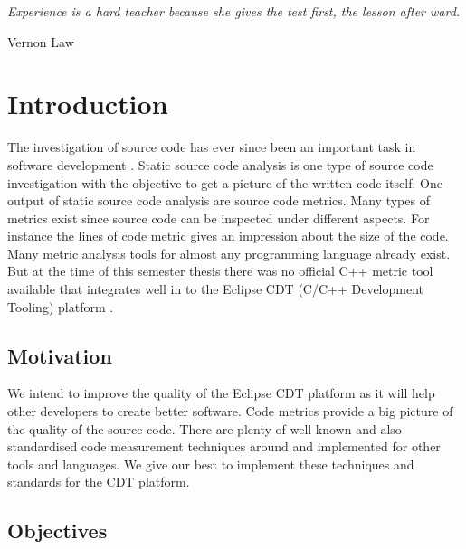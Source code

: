 \documentclass[11pt,a4paper,oneside]{scrreprt}
\begin{document}
\cleardoublepage
\newpage
\thispagestyle{empty}
\mbox{}
\newpage

\setcounter{tocdepth}{2}
\tableofcontents

\vspace{3cm}

\begin{center}
\textit{Experience is a hard teacher because she gives the test first, the lesson after ward.}
\\
\begin{flushright}
Vernon Law
\end{flushright}
\end{center}

\pagebreak
\clearpage{}
\chapter{Introduction}\label{Introduction}
The investigation of source code has ever since been an important task in software development \cite{historystaticanalysis}. Static source code analysis is one type of source code investigation with the objective to get a picture of the written code itself. One output of static source code analysis are source code metrics. Many types of metrics exist since source code can be inspected under different aspects. For instance the lines of code metric gives an impression about the size of the code.\\
Many metric analysis tools for almost any programming language already exist. But at the time of this semester thesis there was no official C++ metric tool available that integrates well in to the Eclipse CDT (C/C++ Development Tooling) platform \cite{CDT}.

\section{Motivation}
We intend to improve the quality of the Eclipse CDT platform as it will help other developers to create better software. Code metrics provide a big picture of the quality of the source code. There are plenty of well known and also standardised code measurement techniques around and implemented for other tools and languages. We give our best to implement these techniques and standards for the CDT platform.

\section{Objectives}
\end{document}
